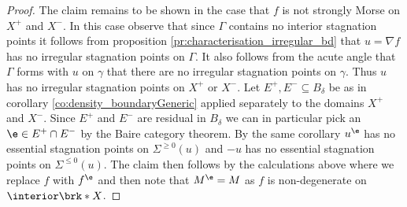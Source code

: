\begin{proof}
  The claim remains to be shown in the case that $f$ is not strongly Morse on $X^+$ and $X^-$. In this case 
  observe that since $\Gamma$ contains no interior stagnation points it follows from proposition \ref{pr:characterisation_irregular_bd}
  that $u=\nabla f$ has no irregular stagnation points on $\Gamma$. It also follows from the acute angle that $\Gamma$ forms with $u$ on $\gamma$ that
  there are no irregular stagnation points on $\gamma$. Thus $u$ has no irregular stagnation points on $X^+$ or $X^-$.
  Let $E^+,E^-\subseteq B_\delta$ be as in corollary \ref{co:density_boundaryGeneric} applied separately to the domains $X^+$ and $X^-$.
  Since $E^+$ and $E^-$ are residual in $B_\delta$ we can in particular pick an $\e\in E^+\cap E^-$ by the Baire category theorem.
  By the same corollary $u^\e$ has no essential stagnation points on $\Sigma^{\geq0}(u)$
  and $-u$ has no essential stagnation points on $\Sigma^{\leq0}(u)$.
  The claim then follows by the calculations above where we replace
  $f$ with $f^\e$ and then note that $M^\e=M$ as $f$ is non-degenerate on $\interior\brk*{X}$.
\end{proof}

